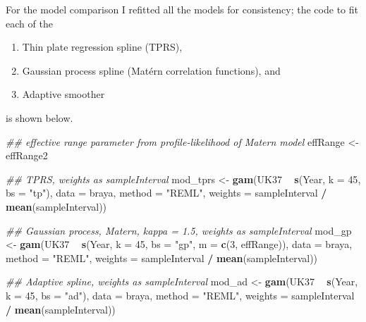\documentclass[12pt,]{article}
\newenvironment{Shaded}{\begin{snugshade}}{\end{snugshade}}
\newcommand{\CommentTok}[1]{\textcolor[rgb]{0.56,0.35,0.01}{\textit{#1}}}
\newcommand{\DataTypeTok}[1]{\textcolor[rgb]{0.13,0.29,0.53}{#1}}
\newcommand{\DecValTok}[1]{\textcolor[rgb]{0.00,0.00,0.81}{#1}}
\newcommand{\KeywordTok}[1]{\textcolor[rgb]{0.13,0.29,0.53}{\textbf{#1}}}
\newcommand{\NormalTok}[1]{#1}
\newcommand{\OperatorTok}[1]{\textcolor[rgb]{0.81,0.36,0.00}{\textbf{#1}}}
\newcommand{\StringTok}[1]{\textcolor[rgb]{0.31,0.60,0.02}{#1}}
\providecommand{\tightlist}{%
  \setlength{\itemsep}{0pt}\setlength{\parskip}{0pt}}
\begin{document}
For the model comparison I refitted all the models for consistency; the
code to fit each of the

\begin{enumerate}
\def\labelenumi{\arabic{enumi}.}
\tightlist
\item
  Thin plate regression spline (TPRS),
\item
  Gaussian process spline (Matérn correlation functions), and
\item
  Adaptive smoother
\end{enumerate}

is shown below.

\begin{Shaded}
\begin{Highlighting}[]
\CommentTok{## effective range parameter from profile-likelihood of Matern model}
\NormalTok{effRange <-}\StringTok{ }\NormalTok{effRange2}

\CommentTok{## TPRS, weights as sampleInterval}
\NormalTok{mod_tprs <-}\StringTok{ }\KeywordTok{gam}\NormalTok{(UK37 }\OperatorTok{~}\StringTok{ }\KeywordTok{s}\NormalTok{(Year, }\DataTypeTok{k =} \DecValTok{45}\NormalTok{, }\DataTypeTok{bs =} \StringTok{"tp"}\NormalTok{), }\DataTypeTok{data =}\NormalTok{ braya,}
                \DataTypeTok{method =} \StringTok{"REML"}\NormalTok{,}
                \DataTypeTok{weights =}\NormalTok{ sampleInterval }\OperatorTok{/}\StringTok{ }\KeywordTok{mean}\NormalTok{(sampleInterval))}

\CommentTok{## Gaussian process, Matern, kappa = 1.5, weights as sampleInterval}
\NormalTok{mod_gp <-}\StringTok{ }\KeywordTok{gam}\NormalTok{(UK37 }\OperatorTok{~}\StringTok{ }\KeywordTok{s}\NormalTok{(Year, }\DataTypeTok{k =} \DecValTok{45}\NormalTok{, }\DataTypeTok{bs =} \StringTok{"gp"}\NormalTok{, }\DataTypeTok{m =} \KeywordTok{c}\NormalTok{(}\DecValTok{3}\NormalTok{, effRange)),}
              \DataTypeTok{data =}\NormalTok{ braya,}
              \DataTypeTok{method =} \StringTok{"REML"}\NormalTok{,}
              \DataTypeTok{weights =}\NormalTok{ sampleInterval }\OperatorTok{/}\StringTok{ }\KeywordTok{mean}\NormalTok{(sampleInterval))}

\CommentTok{## Adaptive spline, weights as sampleInterval}
\NormalTok{mod_ad <-}\StringTok{ }\KeywordTok{gam}\NormalTok{(UK37 }\OperatorTok{~}\StringTok{ }\KeywordTok{s}\NormalTok{(Year, }\DataTypeTok{k =} \DecValTok{45}\NormalTok{, }\DataTypeTok{bs =} \StringTok{"ad"}\NormalTok{), }\DataTypeTok{data =}\NormalTok{ braya,}
              \DataTypeTok{method =} \StringTok{"REML"}\NormalTok{,}
              \DataTypeTok{weights =}\NormalTok{ sampleInterval }\OperatorTok{/}\StringTok{ }\KeywordTok{mean}\NormalTok{(sampleInterval))}
\end{Highlighting}
\end{Shaded}
\end{document}
